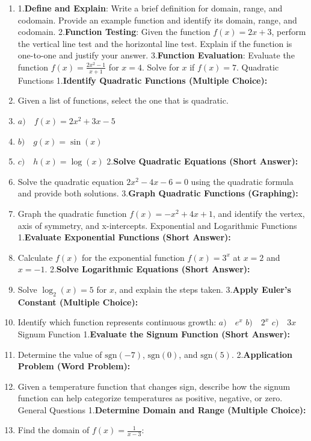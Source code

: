 \begin{enumerate}
    \item 1.\textbf{Define and Explain}: Write a brief definition for domain, range, and codomain. Provide an example function and identify its domain, range, and codomain. 2.\textbf{Function Testing}: Given the function $f(x) = 2x + 3$, perform the vertical line test and the horizontal line test. Explain if the function is one-to-one and justify your answer. 3.\textbf{Function Evaluation}: Evaluate the function $f(x) = \frac{2x^2 - 1}{x + 1}$ for $x = 4$. Solve for $x$ if $f(x) = 7$. Quadratic Functions 1.\textbf{Identify Quadratic Functions (Multiple Choice):}
    \item Given a list of functions, select the one that is quadratic.
    \item $a) \quad f(x) = 2x^2 + 3x - 5$
    \item $b) \quad g(x) = \sin(x)$
    \item $c) \quad h(x) = \log(x)$ 2.\textbf{Solve Quadratic Equations (Short Answer):}
    \item Solve the quadratic equation $ 2x^2 - 4x - 6 = 0 $ using the quadratic formula and provide both solutions. 3.\textbf{Graph Quadratic Functions (Graphing):}
    \item Graph the quadratic function $ f(x) = -x^2 + 4x + 1 $, and identify the vertex, axis of symmetry, and x-intercepts. Exponential and Logarithmic Functions 1.\textbf{Evaluate Exponential Functions (Short Answer):}
    \item Calculate $ f(x) $ for the exponential function $ f(x) = 3^x $ at $ x = 2 $ and $ x = -1 $. 2.\textbf{Solve Logarithmic Equations (Short Answer):}
    \item Solve $ \log_2 (x) = 5 $ for $ x $, and explain the steps taken. 3.\textbf{Apply Euler's Constant (Multiple Choice):}
    \item Identify which function represents continuous growth: $ a) \quad e^x $ $ b) \quad 2^x $ $ c) \quad 3x $ Signum Function 1.\textbf{Evaluate the Signum Function (Short Answer):}
    \item Determine the value of $ \text{sgn}(-7) $, $ \text{sgn}(0) $, and $ \text{sgn}(5) $. 2.\textbf{Application Problem (Word Problem):}
    \item Given a temperature function that changes sign, describe how the signum function can help categorize temperatures as positive, negative, or zero. General Questions 1.\textbf{Determine Domain and Range (Multiple Choice):}
    \item Find the domain of $ f(x) = \frac{1}{x - 3} $:

\end{enumerate}
